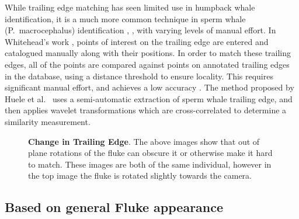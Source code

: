 While trailing edge matching has seen limited use in humpback whale identification, it is a much more common technique in sperm whale (P.\ macrocephalus) identification \cite{huele2000finding}, \cite{beekmans2005comparison} \cite{whitehead1990computer}, with varying levels of manual effort.
In Whitehead's work \cite{whitehead1990computer}, points of interest on the trailing edge are entered and catalogued manually along with their positions.
In order to match these trailing edges, all of the points are compared against points on annotated trailing edges in the database, using a distance threshold to ensure locality.
This requires significant manual effort, and achieves a low accuracy \cite{beekmans2005comparison}.
The method proposed by Huele et al.\ \cite{huele2000finding} uses a semi-automatic extraction of sperm whale trailing edge, and then applies wavelet transformations which are cross-correlated to determine a similarity measurement.

\begin{figure}[t]%
\centering
{}
\newline
{}
\caption[]{\textbf{Change in Trailing Edge}. The above images show that out of plane rotations of the fluke can obscure it or otherwise make it hard to match. These images are both of the same individual, however in the top image the fluke is rotated slightly towards the camera.}
\label{fig:unclear_te}
\end{figure}

\subsection{Based on general Fluke appearance}


